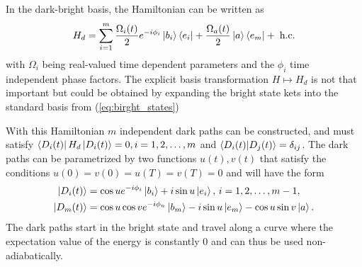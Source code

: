 In the dark-bright basis, the Hamiltonian can be written as
\begin{equation}
H_d = \sum_{i = 1}^m \frac{\Omega_i(t)}{2}e^{-i\phi_i}\ket{b_i}\bra{e_i} + \frac{\Omega_a(t)}{2}\ket{a}\bra{e_m} +\;\text{h.c}.
\label{eq:HamdN}
\end{equation}
with $\Omega_i$ being real-valued time dependent parameters and the $\phi_i$ time independent phase factors. The explicit basis transformation $H \mapsto H_d$ is not that important but could be obtained by expanding the bright state kets into the standard basis from (\ref{eq:birght_states})

With this Hamiltonian $m$ independent dark paths can be constructed, and must satisfy $\bra{D_i(t)}H_d\ket{D_i(t)} = 0, i = 1,2,\dots,m$ and $\bra{D_i(t)}\ket{D_j(t)} = \delta_{ij}$. The dark paths can be parametrized by two functions $u(t),v(t)$ that satisfy the conditions $u(0) = v(0) = u(T) = v(T) = 0$ and  will have the form
\begin{equation}
\begin{aligned}
\ket{D_i(t)} &= \cos u e^{-i\phi_i}\ket{b_i} + i\sin u \ket{e_i},\, i = 1,2,\dots,m-1,
\\
\ket{D_m(t)} &= \cos u \cos v e^{-i\phi_n}\ket{b_m} - i\sin u \ket{e_m} - \cos u \sin v \ket{a}.
\end{aligned}
\end{equation}
The dark paths start in the bright state and travel along a curve where the expectation value of the energy is constantly $0$ and can thus be used non-adiabatically.

